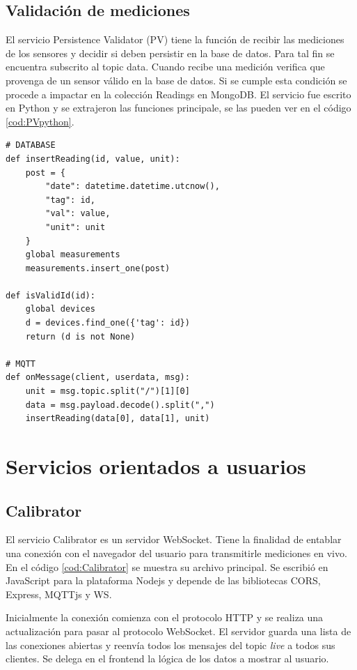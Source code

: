 \subsection{Validación de mediciones}

El servicio Persistence Validator (PV) tiene la función de recibir las mediciones de los sensores y decidir si deben persistir en la base de datos.
Para tal fin se encuentra subscrito al topic data.
Cuando recibe una medición verifica que provenga de un sensor válido en la base de datos.
Si se cumple esta condición se procede a impactar en la colección Readings en MongoDB.
El servicio fue escrito en Python y se extrajeron las funciones principale, se las pueden ver en el código \ref{cod:PVpython}.

\begin{lstlisting}[label=cod:PVpython,caption=Funciones principales del servicio PV]
# DATABASE
def insertReading(id, value, unit):
    post = {
        "date": datetime.datetime.utcnow(),
        "tag": id,
        "val": value,
        "unit": unit
    }
    global measurements
    measurements.insert_one(post)

def isValidId(id):
    global devices
    d = devices.find_one({'tag': id})
    return (d is not None)
    
# MQTT
def onMessage(client, userdata, msg):
    unit = msg.topic.split("/")[1][0]
    data = msg.payload.decode().split(",")
    insertReading(data[0], data[1], unit)    
\end{lstlisting}
	
\section{Servicios orientados a usuarios}

\subsection{Calibrator}
El servicio Calibrator es un servidor WebSocket.
Tiene la finalidad de entablar una conexión con el navegador del usuario para transmitirle mediciones en vivo.
En el código \ref{cod:Calibrator} se muestra su archivo principal.
Se escribió en JavaScript para la plataforma Nodejs y depende de las bibliotecas CORS, Express, MQTTjs y WS.

Inicialmente la conexión comienza con el protocolo HTTP y se realiza una actualización para pasar al protocolo WebSocket.
El servidor guarda una lista de las conexiones abiertas y reenvía todos los mensajes del topic \emph{live} a todos sus clientes.
Se delega en el frontend la lógica de los datos a mostrar al usuario.

